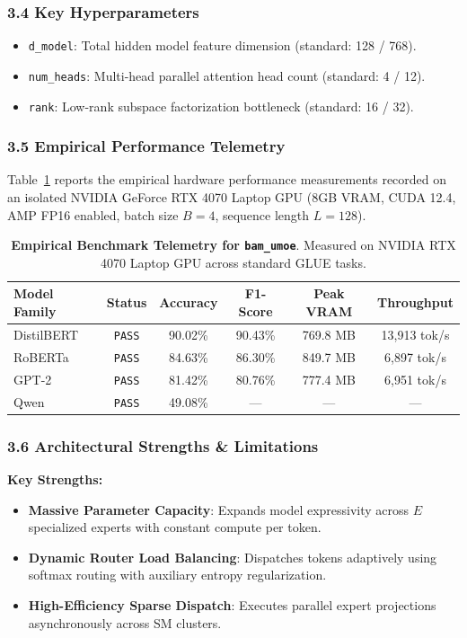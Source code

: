 \subsubsection*{3.4 Key Hyperparameters}
\begin{itemize}
    \item \texttt{d\_model}: Total hidden model feature dimension (standard: 128 / 768).
    \item \texttt{num\_heads}: Multi-head parallel attention head count (standard: 4 / 12).
    \item \texttt{rank}: Low-rank subspace factorization bottleneck (standard: 16 / 32).
\end{itemize}

\subsubsection*{3.5 Empirical Performance Telemetry}
Table~\ref{tab:telemetry_bam_umoe} reports the empirical hardware performance measurements recorded on an isolated NVIDIA GeForce RTX 4070 Laptop GPU (8GB VRAM, CUDA 12.4, AMP FP16 enabled, batch size $B=4$, sequence length $L=128$).

\begin{table}[h]
\centering
\small
\caption{\textbf{Empirical Benchmark Telemetry for \texttt{bam\_umoe}}. Measured on NVIDIA RTX 4070 Laptop GPU across standard GLUE tasks.}
\label{tab:telemetry_bam_umoe}
\begin{tabular*}{\columnwidth}{@{\extracolsep{\fill}}lccccc}
\toprule
\textbf{Model Family} & \textbf{Status} & \textbf{Accuracy} & \textbf{F1-Score} & \textbf{Peak VRAM} & \textbf{Throughput} \\
\midrule
DistilBERT & \texttt{PASS} & 90.02\% & 90.43\% & 769.8 MB & 13,913 tok/s \\
RoBERTa & \texttt{PASS} & 84.63\% & 86.30\% & 849.7 MB & 6,897 tok/s \\
GPT-2 & \texttt{PASS} & 81.42\% & 80.76\% & 777.4 MB & 6,951 tok/s \\
Qwen & \texttt{PASS} & 49.08\% & --- & --- & --- \\
\bottomrule
\end{tabular*}
\end{table}

\subsubsection*{3.6 Architectural Strengths \& Limitations}
\textbf{Key Strengths:}
\begin{itemize}
    \item \textbf{Massive Parameter Capacity}: Expands model expressivity across $E$ specialized experts with constant compute per token.
    \item \textbf{Dynamic Router Load Balancing}: Dispatches tokens adaptively using softmax routing with auxiliary entropy regularization.
    \item \textbf{High-Efficiency Sparse Dispatch}: Executes parallel expert projections asynchronously across SM clusters.
\end{itemize}


